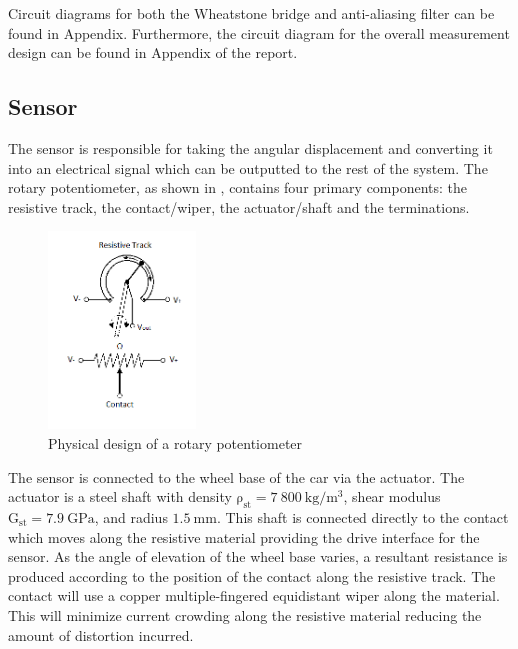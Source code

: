 \documentclass[10pt,twocolumn]{witseiepaper}
\begin{document}
Circuit diagrams for both the Wheatstone bridge and anti-aliasing filter can be found in Appendix. Furthermore, the circuit diagram for the overall measurement design can be found in Appendix of the report.

\subsection{Sensor}

The sensor is responsible for taking the angular displacement and converting it into an electrical signal which can be outputted to the rest of the system. The rotary potentiometer, as shown in , contains four primary components: the resistive track, the contact/wiper, the actuator/shaft and the terminations.

\begin{figure}[h!]
	\centering
	\label{pot}
	\includegraphics[width=0.35\textwidth]{Pot2.png}
	\caption{Physical design of a rotary potentiometer}
\end{figure}

The sensor is connected to the wheel base of the car via the actuator. The actuator is a steel shaft with density $\mathrm{\rho_{st}} =  7~800~\mathrm{kg/m^3}$, shear modulus $\mathrm{G_{st}} = 7.9~\mathrm{GPa}$, and radius $1.5~\mathrm{mm} $. This shaft is connected directly to the contact which moves along the resistive material providing the drive interface for the sensor. As the angle of elevation of the wheel base varies, a resultant resistance is produced according to the position of the contact along the resistive track. The contact will use a copper multiple-fingered equidistant wiper along the material. This will minimize current crowding along the resistive material reducing the amount of distortion incurred\cite{handbook}.
\end{document}
